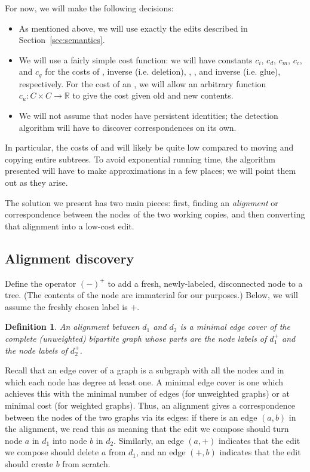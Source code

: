 \documentclass{article}
\newtheorem{definition}{Definition}
\begin{document}
For now, we will make the following decisions:
\begin{itemize}
    \item As mentioned above, we will use exactly the edits described in
        Section~\ref{sec:semantics}.
    \item We will use a fairly simple cost function: we will have constants
        $c_i$, $c_d$, $c_m$, $c_c$, and $c_g$ for the costs of \einsert,
        inverse \einsert (i.e. deletion), \emove, \ecopy, and inverse \ecopy
        (i.e. glue), respectively. For the cost of an \eupdate, we will
        allow an arbitrary function $c_u:C \times C \to \mathbb{R}$ to give
        the cost given old and new contents.
    \item We will not assume that nodes have persistent identities; the
        detection algorithm will have to discover correspondences on its
        own.
\end{itemize}
In particular, the costs of \emove and \ecopy will likely be quite low
compared to moving and copying entire subtrees. To avoid exponential running
time, the algorithm presented will have to make approximations in a few
places; we will point them out as they arise.

The solution we present has two main pieces: first, finding an
\emph{alignment} or correspondence between the nodes of the two working
copies, and then converting that alignment into a low-cost edit.

\subsection{Alignment discovery}
Define the operator $(-)^+$ to add a fresh, newly-labeled, disconnected node
to a tree. (The contents of the node are immaterial for our purposes.)
Below, we will assume the freshly chosen label is $+$.

\begin{definition}
    An \emph{alignment} between $d_1$ and $d_2$ is a minimal edge cover of
    the complete (unweighted) bipartite graph whose parts are the node
    labels of $d_1^+$ and the node labels of $d_2^+$.
\end{definition}

Recall that an edge cover of a graph is a subgraph with all the nodes and in
which each node has degree at least one. A minimal edge cover is one which
achieves this with the minimal number of edges (for unweighted graphs) or at
minimal cost (for weighted graphs). Thus, an alignment gives a
correspondence between the nodes of the two graphs via its edges: if there
is an edge $(a,b)$ in the alignment, we read this as meaning that the
edit we compose should turn node $a$ in $d_1$ into node $b$ in $d_2$.
Similarly, an edge $(a,+)$ indicates that the edit we compose should delete
$a$ from $d_1$, and an edge $(+,b)$ indicates that the edit should create
$b$ from scratch.
\end{document}
